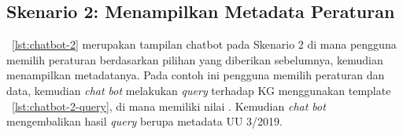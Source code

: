 \subsection{Skenario 2: Menampilkan Metadata Peraturan}
\label{subsec:skenario-2}

\lst~\ref{lst:chatbot-2} merupakan tampilan chatbot pada Skenario 2 di mana pengguna memilih
peraturan berdasarkan pilihan yang diberikan sebelumnya, kemudian menampilkan metadatanya. Pada
contoh ini pengguna memilih peraturan  dan data, kemudian
\textit{chat bot} melakukan \textit{query} terhadap KG menggunakan template
\lst~\ref{lst:chatbot-2-query}, di mana  memiliki nilai . Kemudian
\textit{chat bot} mengembalikan hasil \textit{query} berupa metadata UU 3/2019.

